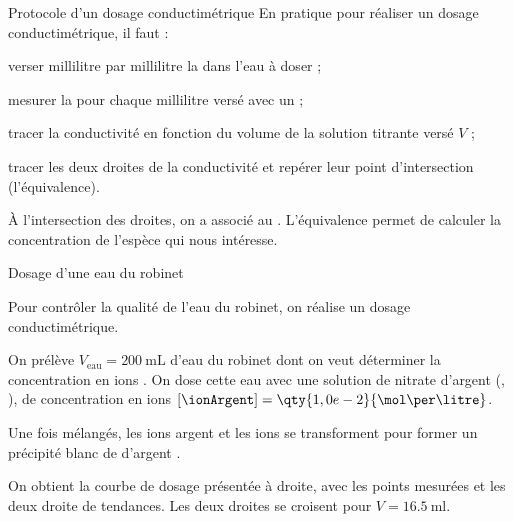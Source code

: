 \begin{doc}{Protocole d'un dosage conductimétrique}
  En pratique pour réaliser un dosage conductimétrique, il faut :
  \begin{protocole}
    \item verser millilitre par millilitre la  dans l'eau à doser ;
    \item mesurer la  pour chaque millilitre versé avec un  ;
    \item tracer la conductivité en fonction du volume de la solution titrante versé $V$ ;
    \item tracer les deux droites de la conductivité et repérer leur point d'intersection (l'équivalence).
  \end{protocole}

  \vspace*{-10pt}
  \begin{wrapfigure}[2]{r}{0.5\linewidth}
    \hspace*{-60pt}
  \end{wrapfigure}

  \vAligne{-24pt}
  \begin{importants}  
    À l'intersection des droites, on a  associé au .
    L'équivalence permet de calculer la concentration de l'espèce qui nous intéresse.
  \end{importants}
  \vAligne{3.2cm}
  \phantom{b}
\end{doc}

\newpage
\begin{doc}{Dosage d'une eau du robinet}
  \begin{wrapfigure}{r}{0.4\linewidth}
    \vspace*{-36pt}
    \centering
  \end{wrapfigure}
  Pour contrôler la qualité de l'eau du robinet, on réalise un dosage conductimétrique.

  On prélève $V_\text{eau} = \qty{200}{\mL}$ d'eau du robinet dont on veut déterminer la concentration en ions  \chlorure.
  On dose cette eau avec une solution de nitrate d'argent (\ionArgent, \nitrate), de concentration en ions $[\ionArgent] = \qty{1,0e-2}{\mol\per\litre}$.

  Une fois mélangés, les ions argent et les ions  se transforment pour former un précipité blanc de  d'argent \chlorureDArgent.

  On obtient la courbe de dosage présentée à droite, avec les points mesurées et les deux droite de tendances.
  Les deux droites se croisent pour $V = \qty{16,5}{\ml}$.
\end{doc}

